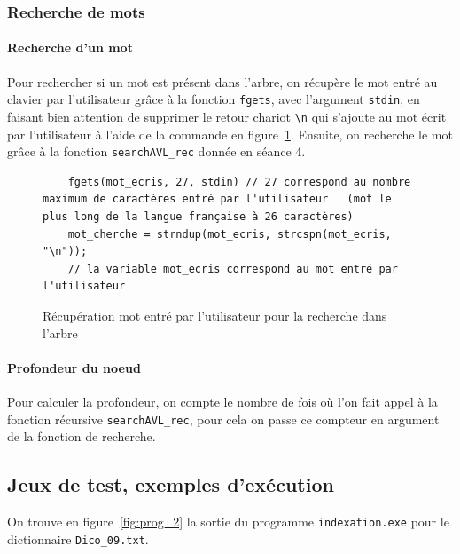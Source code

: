 \documentclass{article} %
\begin{document}
\subsubsection{Recherche de mots}

\paragraph{Recherche d'un mot}Pour rechercher si un mot est présent dans l'arbre, on récupère le mot entré au clavier par l'utilisateur grâce à la fonction \texttt{fgets}, avec l'argument \texttt{stdin}, en faisant bien attention de supprimer le retour chariot \texttt{\textbackslash n} qui s'ajoute au mot écrit par l'utilisateur à l'aide de la commande en figure~\ref{fig:recherche_mot}. Ensuite, on recherche le mot grâce à la fonction \texttt{searchAVL\_rec} donnée en séance 4. 

\begin{figure}[H]
  \begin{lstlisting}
    fgets(mot_ecris, 27, stdin) // 27 correspond au nombre maximum de caractères entré par l'utilisateur   (mot le plus long de la langue française à 26 caractères)
    mot_cherche = strndup(mot_ecris, strcspn(mot_ecris, "\n"));
    // la variable mot_ecris correspond au mot entré par l'utilisateur \end{lstlisting}
  
    \caption{Récupération mot entré par l'utilisateur pour la recherche dans l'arbre}
    \label{fig:recherche_mot}
\end{figure}


\paragraph{Profondeur du noeud} Pour calculer la profondeur, on compte le nombre de fois où l'on fait appel à la fonction récursive \texttt{searchAVL\_rec}, pour cela on passe ce compteur en argument de la fonction de recherche. 

\subsection{Jeux de test, exemples d'exécution}
On trouve en figure~\ref{fig:prog_2} la sortie du programme \texttt{indexation.exe} pour le dictionnaire \texttt{Dico\_09.txt}.
\end{document}
